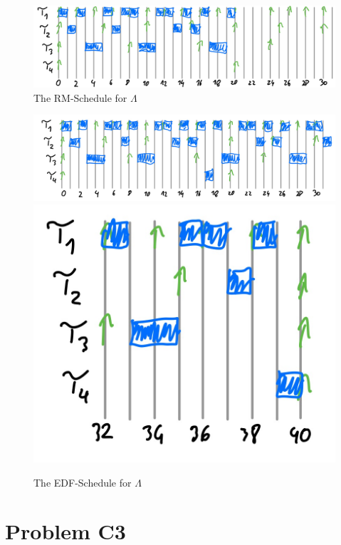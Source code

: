 \documentclass[12pt]{article}
\begin{document}
\begin{itemize}
		\begin{figure}[h]
		\centering
		\includegraphics[scale = 0.2]{figures/c2_3}
		\caption{The RM-Schedule for $\Lambda$}
		\end{figure}

		\begin{figure}[h]
		\centering
		\includegraphics[scale = 0.15]{figures/c2_4}
		\includegraphics[scale = 0.15]{figures/c2_5}
		\caption{The EDF-Schedule for $\Lambda$}
		\end{figure}
\end{itemize}

\section*{Problem C3}
\end{document}
